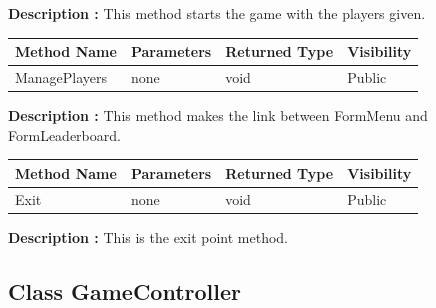 \documentclass[12pt]{article}
\begin{document}
    \textbf{Description :} This method starts the game with the players given.

    \begin{table}[H]
        \begin{tabular}{|l|l|l|l|}
            \hline
            \rowcolor[HTML]{EFEFEF}
            \cellcolor[HTML]{EFEFEF}\textbf{Method Name} & \textbf{Parameters} & \textbf{Returned Type} & \textbf{Visibility} \\ \hline
            ManagePlayers                                & none                & void                   & Public              \\ \hline
        \end{tabular}
    \end{table}

    \textbf{Description :} This method makes the link between FormMenu and FormLeaderboard.

    \begin{table}[H]
        \begin{tabular}{|l|l|l|l|}
            \hline
            \rowcolor[HTML]{EFEFEF}
            \cellcolor[HTML]{EFEFEF}\textbf{Method Name} & \textbf{Parameters} & \textbf{Returned Type} & \textbf{Visibility} \\ \hline
            Exit                                         & none                & void                   & Public              \\ \hline
        \end{tabular}
    \end{table}

    \textbf{Description :} This is the exit point method.

    \newpage


    \subsection{Class GameController}
\end{document}
